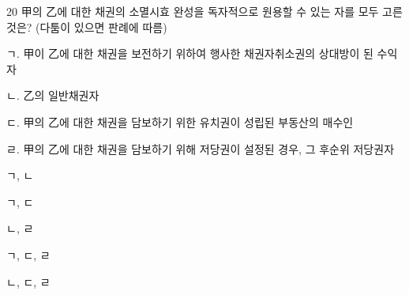 \begin{question}{20}
甲의 乙에 대한 채권의 소멸시효 완성을 독자적으로 원용할 수 있는 자를 모두 고른 것은? (다툼이 있으면 판례에 따름)
\begin{framedtext}
ㄱ. 甲이 乙에 대한 채권을 보전하기 위하여 행사한 채권자취소권의 상대방이 된 수익자 \par
ㄴ. 乙의 일반채권자 \par
ㄷ. 甲의 乙에 대한 채권을 담보하기 위한 유치권이 성립된 부동산의 매수인 \par
ㄹ. 甲의 乙에 대한 채권을 담보하기 위해 저당권이 설정된 경우, 그 후순위 저당권자 \par
\end{framedtext}
\begin{choices}
  \item ㄱ, ㄴ
  \item ㄱ, ㄷ
  \item ㄴ, ㄹ
  \item ㄱ, ㄷ, ㄹ
  \item ㄴ, ㄷ, ㄹ
\end{choices}
\end{question}
